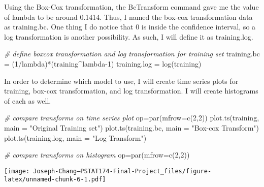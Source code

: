 \documentclass[
]{article}
\newenvironment{Shaded}{\begin{snugshade}}{\end{snugshade}}
\newcommand{\AttributeTok}[1]{\textcolor[rgb]{0.77,0.63,0.00}{#1}}
\newcommand{\CommentTok}[1]{\textcolor[rgb]{0.56,0.35,0.01}{\textit{#1}}}
\newcommand{\DecValTok}[1]{\textcolor[rgb]{0.00,0.00,0.81}{#1}}
\newcommand{\FunctionTok}[1]{\textcolor[rgb]{0.00,0.00,0.00}{#1}}
\newcommand{\NormalTok}[1]{#1}
\newcommand{\OtherTok}[1]{\textcolor[rgb]{0.56,0.35,0.01}{#1}}
\newcommand{\SpecialCharTok}[1]{\textcolor[rgb]{0.00,0.00,0.00}{#1}}
\newcommand{\StringTok}[1]{\textcolor[rgb]{0.31,0.60,0.02}{#1}}
\begin{document}
Using the Box-Cox transformation, the BcTransform command gave me the
value of lambda to be around 0.1414. Thus, I named the box-cox
transformation data as training.bc. One thing I do notice that 0 is
inside the confidence interval, so a log transformation is another
possibility. As such, I will define it as training.log.

\begin{Shaded}
\begin{Highlighting}[]
\CommentTok{\# define boxcox transformation and log transformation for training set}
\NormalTok{training.bc }\OtherTok{=}\NormalTok{ (}\DecValTok{1}\SpecialCharTok{/}\NormalTok{lambda)}\SpecialCharTok{*}\NormalTok{(training}\SpecialCharTok{\^{}}\NormalTok{lambda}\DecValTok{{-}1}\NormalTok{)}
\NormalTok{training.log }\OtherTok{=} \FunctionTok{log}\NormalTok{(training)}
\end{Highlighting}
\end{Shaded}

In order to determine which model to use, I will create time series
plots for training, box-cox transformation, and log transformation. I
will create histograms of each as well.

\begin{Shaded}
\begin{Highlighting}[]
\CommentTok{\# compare transforms on time series plot}
\NormalTok{op}\OtherTok{=}\FunctionTok{par}\NormalTok{(}\AttributeTok{mfrow=}\FunctionTok{c}\NormalTok{(}\DecValTok{2}\NormalTok{,}\DecValTok{2}\NormalTok{))}
\FunctionTok{plot.ts}\NormalTok{(training, }\AttributeTok{main =} \StringTok{"Original Training set"}\NormalTok{)}
\FunctionTok{plot.ts}\NormalTok{(training.bc, }\AttributeTok{main =} \StringTok{"Box{-}cox Transform"}\NormalTok{)}
\FunctionTok{plot.ts}\NormalTok{(training.log, }\AttributeTok{main =} \StringTok{"Log Transform"}\NormalTok{)}

\CommentTok{\# compare transforms on histogram}
\NormalTok{op}\OtherTok{=}\FunctionTok{par}\NormalTok{(}\AttributeTok{mfrow=}\FunctionTok{c}\NormalTok{(}\DecValTok{2}\NormalTok{,}\DecValTok{2}\NormalTok{))}
\end{Highlighting}
\end{Shaded}

\texttt{[image: Joseph-Chang---PSTAT174-Final-Project\_files/figure-latex/unnamed-chunk-6-1.pdf]}
\end{document}
